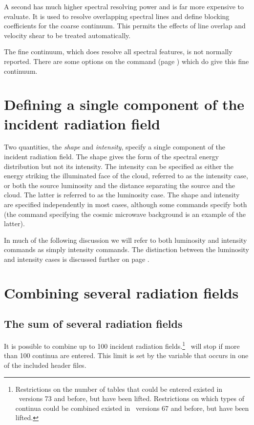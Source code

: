 A second  has much higher spectral resolving power and
is far more expensive to evaluate.
It is used to resolve overlapping spectral
lines and define blocking coefficients for the coarse continuum.  This
permits the effects of line overlap and velocity shear to be treated
automatically.

The fine continuum, which does resolve all spectral features,
is not normally reported.
There are some options
on the  command 
(page \pageref{sec:CommandSaveContinuum}) which do give
this fine continuum.

\section{Defining a single component of the incident radiation field}

Two quantities, the \emph{shape} and \emph{intensity},
specify a single component of the incident radiation field.
The shape gives the form of the spectral energy distribution
but not its intensity.
The intensity can be specified as either the energy striking
the illuminated face of the cloud, referred to as
the intensity case, or both the source luminosity and the
distance separating the source and the cloud.  
The latter is referred to as the luminosity case.
The shape and intensity are specified independently
in most cases, although some commands specify both 
(the command specifying
the cosmic microwave background is an example of the latter).

In much of the following discussion we will refer to both
luminosity and intensity commands as simply intensity commands.
The distinction between the luminosity and intensity cases
is discussed further on page \pageref{sec:IntensityLuminosityCases}.

\section{Combining several radiation fields}

\subsection{The sum of several radiation fields}

It is possible to combine up to 100 incident radiation fields.\footnote{
Restrictions on the number of tables that could be entered existed
in \Cloudy\ versions 73 and before, but have been lifted. Restrictions on
which types of continua could be combined existed in \Cloudy\ versions 67
and before, but have been lifted.}   \Cloudy\ will stop if
more than 100 continua are entered.
This limit is set by the variable 
that occurs in one of the included header files.

